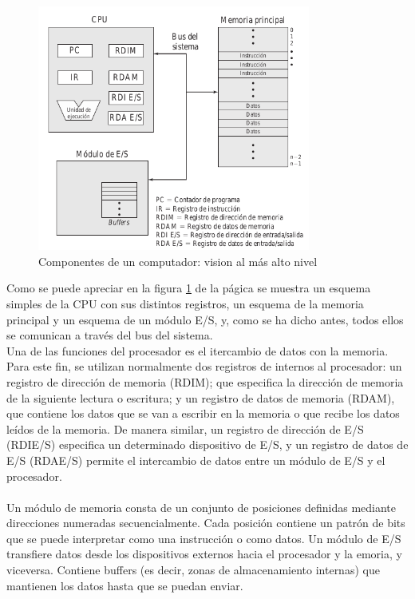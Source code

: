 \documentclass{article}
\begin{document}
		\begin{figure}
			\caption{Componentes de un computador: vision al más alto nivel}
			\label{fig1.1:componentes}
			\centering
			\includegraphics[width=0.8\textwidth, scale=0.5]{figura1.png}
		
			
		\end{figure}
	
		Como se puede apreciar en la figura \ref{fig1.1:componentes} de la págica \pageref{fig1.1:componentes} se muestra un esquema simples de la CPU con sus distintos registros, un esquema de la memoria principal y un esquema de un módulo E/S, y, como se ha dicho antes, todos ellos se comunican a través del bus del sistema. \\
		Una de las funciones del procesador es el itercambio de datos con la memoria. Para este fin, se utilizan normalmente dos registros de internos al procesador: un registro de dirección de memoria (RDIM); que especifica la dirección de memoria de la siguiente lectura o escritura; y un registro de datos de memoria (RDAM), que contiene los datos que se van a escribir en la memoria o que recibe los datos leídos de la memoria. De manera similar, un registro de dirección de E/S (RDIE/S) especifica un determinado dispositivo de E/S, y un registro de datos de E/S (RDAE/S) permite el intercambio de datos entre un módulo de E/S y el procesador. \\ \\
		
		Un módulo de memoria consta de un conjunto de posiciones definidas mediante direcciones numeradas secuencialmente. Cada posición contiene un patrón de bits que se puede interpretar como una instrucción o como datos. Un módulo de E/S transfiere datos desde los dispositivos externos hacia el procesador y la emoria, y viceversa. Contiene buffers (es decir, zonas de almacenamiento internas) que mantienen los datos hasta que se puedan enviar.
\end{document}
